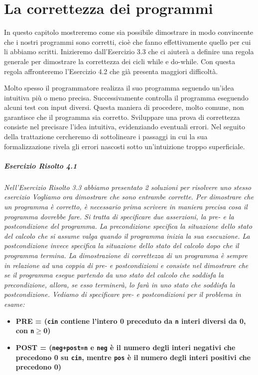 \chapter{La correttezza dei programmi}
\noindent In questo capitolo mostreremo come sia possibile dimostrare in modo convincente che i nostri programmi sono corretti, cioè che fanno effettivamente quello per cui li abbiamo scritti.
Inizieremo dall'Esercizio 3.3 che ci aiuterà a definire una regola generale per dimostrare la correttezza dei cicli while e do-while.
Con questa regola affronteremo l'Esercizio 4.2 che già presenta maggiori difficoltà. 

Molto spesso il programmatore realizza il suo programma seguendo un'idea intuitiva più o meno precisa.
Successivamente controlla il programma eseguendo alcuni test con input diversi.
Questa maniera di procedere, molto comune, non garantisce che il programma sia corretto.
Sviluppare una prova di correttezza consiste nel precisare l'idea intuitiva, evidenziando eventuali errori.
Nel seguito della trattazione cercheremo di sottolineare i passaggi in cui la sua formalizzazione rivela gli errori nascosti sotto un'intuizione troppo superficiale.

\bigskip
\bigskip

\paragraph{Esercizio Risolto 4.1}
\textit{Nell'Esercizio Risolto 3.3 abbiamo presentato 2 soluzioni per risolvere uno stesso esercizio
Vogliamo ora dimostrare che sono entrambe corrette.
Per dimostrare che un programma è corretto, è necessario prima scrivere in maniera precisa cosa il programma dovrebbe fare.
Si tratta di specificare due asserzioni, la pre- e la postcondizione del programma.
La precondizione specifica la situazione dello stato del calcolo che si assume valga quando il programma inizia la sua esecuzione.
La postcondizione invece specifica la situazione dello stato del calcolo dopo che il programma termina.
La dimostrazione di correttezza di un programma è sempre in relazione ad una coppia di pre- e postcondizioni e consiste nel dimostrare che se il programma esegue partendo da uno stato del calcolo che soddisfa la precondizione, allora, se esso terminerà, lo farà in uno stato che soddisfa la postcondizione.
Vediamo di specificare pre- e postcondizioni per il problema in esame:}

\begin{itemize}

\item
\textbf{PRE = (\texttt{cin} contiene l'intero 0 preceduto da \texttt{n} interi diversi da 0, con \texttt{n$\geq$}0)}

\item
\textbf{POST = (\texttt{neg+post=n} e \texttt{neg} è il numero degli interi negativi che precedono 0 su \texttt{cin}, mentre \texttt{pos} è il numero degli interi positivi che precedono 0)}

\end{itemize}

